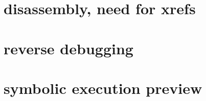 



\section{disassembly, need for xrefs}


\section{reverse debugging}


\section{symbolic execution preview}




